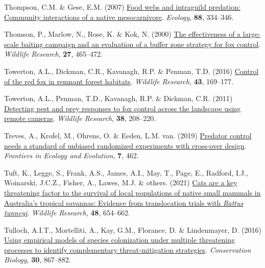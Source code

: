 \documentclass[11pt,a4paper,titlepage,twoside,openright]{style/unimelbthesis}
\newenvironment{CSLReferences}%
  {}%
  {\par}
\begin{document}
\begin{mainmatter}
\begin{CSLReferences}{1}{0}
\leavevmode{}%
Thompson, C.M. \& Gese, E.M. (2007) \href{https://doi.org/10.1890/0012-9658(2007)88\%5B334:FWAIPC\%5D2.0.CO;2}{Food webs and intraguild predation: Community interactions of a native mesocarnivore}. \emph{Ecology}, \textbf{88}, 334--346.

\leavevmode{}%
Thomson, P., Marlow, N., Rose, K. \& Kok, N. (2000) \href{https://doi.org/10.1071/WR99036}{The effectiveness of a large-scale baiting campaign and an evaluation of a buffer zone strategy for fox control}. \emph{Wildlife Research}, \textbf{27}, 465--472.

\leavevmode{}%
Towerton, A.L., Dickman, C.R., Kavanagh, R.P. \& Penman, T.D. (2016) \href{https://doi.org/10.1071/WR15133}{Control of the red fox in remnant forest habitats}. \emph{Wildlife Research}, \textbf{43}, 169--177.

\leavevmode{}%
Towerton, A.L., Penman, T.D., Kavanagh, R.P. \& Dickman, C.R. (2011) \href{https://doi.org/10.1071/WR10213}{Detecting pest and prey responses to fox control across the landscape using remote cameras}. \emph{Wildlife Research}, \textbf{38}, 208--220.

\leavevmode{}%
Treves, A., Krofel, M., Ohrens, O. \& Eeden, L.M. van. (2019) \href{https://doi.org/10.3389/fevo.2019.00462}{Predator control needs a standard of unbiased randomized experiments with cross-over design}. \emph{Frontiers in Ecology and Evolution}, \textbf{7}, 462.

\leavevmode{}%
Tuft, K., Legge, S., Frank, A.S., James, A.I., May, T., Page, E., Radford, I.J., Woinarski, J.C.Z., Fisher, A., Lawes, M.J. \& others. (2021) \href{https://doi.org/10.1071/WR20193}{Cats are a key threatening factor to the survival of local populations of native small mammals in {A}ustralia's tropical savannas: Evidence from translocation trials with \emph{{R}attus tunneyi}}. \emph{Wildlife Research}, \textbf{48}, 654--662.

\leavevmode{}%
Tulloch, A.I.T., Mortelliti, A., Kay, G.M., Florance, D. \& Lindenmayer, D. (2016) \href{https://doi.org/10.1111/cobi.12672}{Using empirical models of species colonization under multiple threatening processes to identify complementary threat-mitigation strategies}. \emph{Conservation Biology}, \textbf{30}, 867--882.


\end{CSLReferences}
\end{mainmatter}
\end{document}
